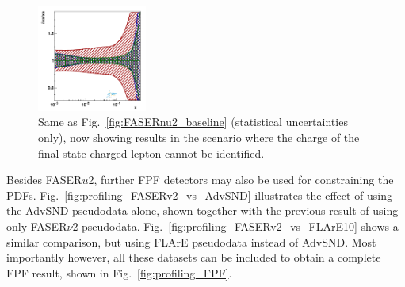 \begin{figure}[t]
\includegraphics[width=0.32\textwidth]{plots/proton_fasernu2/nochargediscrimination/statOnly_FASERv2_q2_10000_pdf_s_ratio.pdf}
\caption{Same as Fig.~\ref{fig:FASERnu2_baseline} (statistical uncertainties only),
  now showing results in the scenario where the charge of the final-state charged lepton
  cannot be identified.
 }
\label{fig:FASERnu2_nochargeID}
\end{figure}



Besides FASER$u$2, further FPF detectors may also be used for constraining the PDFs. 
Fig.~\ref{fig:profiling_FASERv2_vs_AdvSND} illustrates the effect of using the AdvSND pseudodata alone, 
shown together with the previous result of using only FASER$\nu$2 pseudodata. 
Fig.~\ref{fig:profiling_FASERv2_vs_FLArE10} shows a similar comparison, 
but using FLArE pseudodata instead of AdvSND. 
Most importantly however, all these datasets can be included to obtain a complete FPF result, 
shown in Fig.~\ref{fig:profiling_FPF}.

